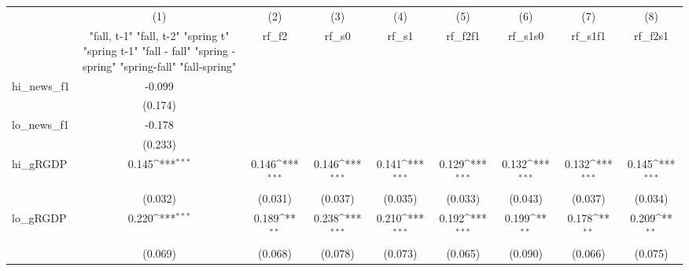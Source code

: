 {
\def\sym#1{\ifmmode^{#1}\else\(^{#1}\)\fi}
\begin{tabular}{l*{8}{c}}
\toprule
            &\multicolumn{1}{c}{(1)}&\multicolumn{1}{c}{(2)}&\multicolumn{1}{c}{(3)}&\multicolumn{1}{c}{(4)}&\multicolumn{1}{c}{(5)}&\multicolumn{1}{c}{(6)}&\multicolumn{1}{c}{(7)}&\multicolumn{1}{c}{(8)}\\
            &\multicolumn{1}{c}{  "fall, t-1" "fall, t-2" "spring t" "spring t-1"  "fall - fall" "spring - spring" "spring-fall" "fall-spring" }&\multicolumn{1}{c}{rf\_f2}&\multicolumn{1}{c}{rf\_s0}&\multicolumn{1}{c}{rf\_s1}&\multicolumn{1}{c}{rf\_f2f1}&\multicolumn{1}{c}{rf\_s1s0}&\multicolumn{1}{c}{rf\_s1f1}&\multicolumn{1}{c}{rf\_f2s1}\\
\midrule
hi\_news\_f1  &      -0.099         &                     &                     &                     &                     &                     &                     &                     \\
            &     (0.174)         &                     &                     &                     &                     &                     &                     &                     \\
\addlinespace
lo\_news\_f1  &      -0.178         &                     &                     &                     &                     &                     &                     &                     \\
            &     (0.233)         &                     &                     &                     &                     &                     &                     &                     \\
\addlinespace
hi\_gRGDP    &       0.145\sym{***}&       0.146\sym{***}&       0.146\sym{***}&       0.141\sym{***}&       0.129\sym{***}&       0.132\sym{***}&       0.132\sym{***}&       0.145\sym{***}\\
            &     (0.032)         &     (0.031)         &     (0.037)         &     (0.035)         &     (0.033)         &     (0.043)         &     (0.037)         &     (0.034)         \\
\addlinespace
lo\_gRGDP    &       0.220\sym{***}&       0.189\sym{**} &       0.238\sym{***}&       0.210\sym{***}&       0.192\sym{***}&       0.199\sym{**} &       0.178\sym{**} &       0.209\sym{**} \\
            &     (0.069)         &     (0.068)         &     (0.078)         &     (0.073)         &     (0.065)         &     (0.090)         &     (0.066)         &     (0.075)         \\

\end{tabular}}
